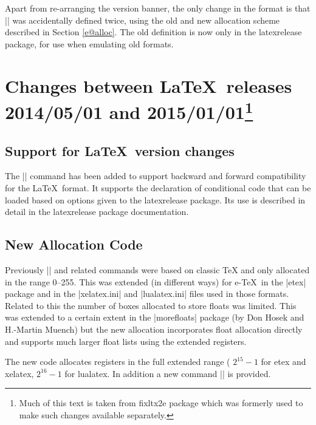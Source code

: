 \documentclass{ltxguide}
\newcommand\Lpack[1]{\mbox{\textsf{#1}}}
\newcommand\DescribeMacro[1]{\texttt{\string#1}}
\begin{document}
Apart from re-arranging the version banner, the only change in the
format is that |\newtoks| was accidentally defined twice, using the
old and new allocation scheme described in Section \ref{e@alloc}.
The old definition is now only in the \Lpack{latexrelease} package,
for use when emulating old formats.




\section
[Changes between  \LaTeX\ releases 2014/05/01 and 2015/01/01]
{Changes between \LaTeX\ releases 2014/05/01 and 2015/01/01\footnote{Much of this text
is taken from \Lpack{fixltx2e} package which was formerly used to make such changes available separately.}}

\subsection{Support for \LaTeX\ version changes}
\DescribeMacro{}

\smallskip

The || command has been added to support backward and
forward compatibility for the \LaTeX\ format. It supports the
declaration of conditional code that can be loaded based on options
given to the \Lpack{latexrelease} package. Its use is described in
detail in the \Lpack{latexrelease} package documentation.

\subsection{New Allocation Code\label{e@alloc}}
Previously |\newcount| and related commands were based on classic TeX
and only allocated in the range 0--255. This was extended (in
different ways) for e-\TeX\ in the |etex| package and in the
|xelatex.ini| and |lualatex.ini| files used in those formats. Related
to this the number of boxes allocated to store floats was
limited. This was extended to a certain extent in the |morefloats|
package (by Don Hosek and H.-Martin Muench) but the new allocation
incorporates float allocation directly and supports much larger float
lists using the extended registers.

The new code allocates registers in the full extended range (
$2^{15}-1$ for etex and xelatex, $2^{16}-1$ for lualatex.
In addition a new command |\extrafloats| is provided.
\end{document}
